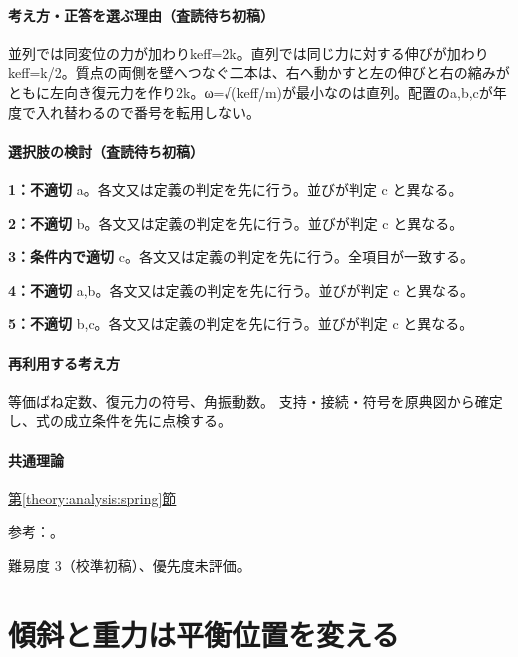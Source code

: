 \paragraph{考え方・正答を選ぶ理由（査読待ち初稿）} 並列では同変位の力が加わりkeff=\allowbreak{}2k。直列では同じ力に対する伸びが加わりkeff=\allowbreak{}k/2。質点の両側を壁へつなぐ二本は、右へ動かすと左の伸びと右の縮みがともに左向き復元力を作り2k。ω=√(keff/m)が最小なのは直列。配置のa,b,cが年度で入れ替わるので番号を転用しない。

\paragraph{選択肢の検討（査読待ち初稿）}\mbox{}\par

\noindent\textbf{1：不適切} a。各文又は定義の判定を先に行う。並びが判定 c と異なる。\par

\noindent\textbf{2：不適切} b。各文又は定義の判定を先に行う。並びが判定 c と異なる。\par

\noindent\textbf{3：条件内で適切} c。各文又は定義の判定を先に行う。全項目が一致する。\par

\noindent\textbf{4：不適切} a,b。各文又は定義の判定を先に行う。並びが判定 c と異なる。\par

\noindent\textbf{5：不適切} b,c。各文又は定義の判定を先に行う。並びが判定 c と異なる。\par

\paragraph{再利用する考え方} 等価ばね定数、復元力の符号、角振動数。 支持・接続・符号を原典図から確定し、式の成立条件を先に点検する。

\paragraph{共通理論} \hyperref[theory:analysis:spring]{第\ref*{theory:analysis:spring}節}

\par 参考：\cite{analysis57_shm}。

\par 難易度 3（校準初稿）、優先度未評価。

\section{傾斜と重力は平衡位置を変える}

